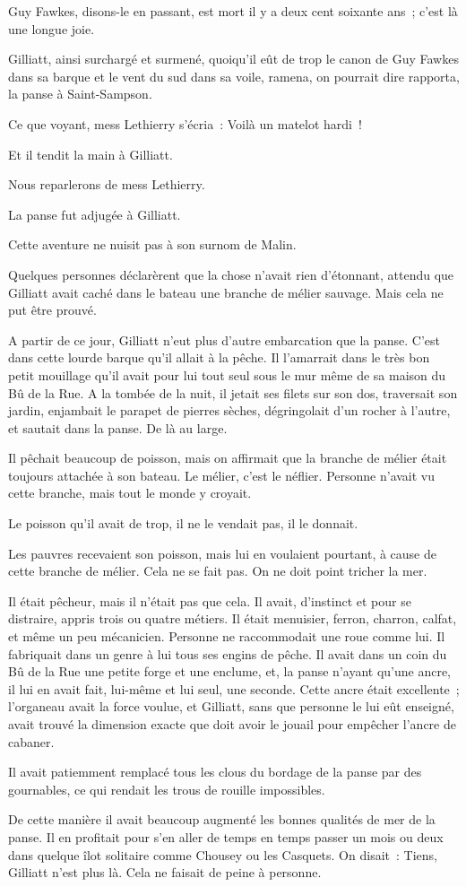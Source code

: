 \documentclass[french,twoside]{book} %
\begin{document}
Guy Fawkes, disons-le en passant, est mort il y a deux cent soixante ans ; c’est là une longue joie.\par
Gilliatt, ainsi surchargé et surmené, quoiqu’il eût de trop le canon de Guy Fawkes dans sa barque et le vent du sud dans sa voile, ramena, on pourrait dire rapporta, la panse à Saint-Sampson.\par
 Ce que voyant, mess Lethierry s’écria : Voilà un matelot hardi !\par
Et il tendit la main à Gilliatt.\par
Nous reparlerons de mess Lethierry.\par
La panse fut adjugée à Gilliatt.\par
Cette aventure ne nuisit pas à son surnom de Malin.\par
Quelques personnes déclarèrent que la chose n’avait rien d’étonnant, attendu que Gilliatt avait caché dans le bateau une branche de mélier sauvage. Mais cela ne put être prouvé.\par
A partir de ce jour, Gilliatt n’eut plus d’autre embarcation que la panse. C’est dans cette lourde barque qu’il allait à la pêche. Il l’amarrait dans le très bon petit mouillage qu’il avait pour lui tout seul sous le mur même de sa maison du Bû de la Rue. A la tombée de la nuit, il jetait ses filets sur son dos, traversait son jardin, enjambait le parapet de pierres sèches, dégringolait d’un rocher à l’autre, et sautait dans la panse. De là au large.\par
Il pêchait beaucoup de poisson, mais on affirmait que la branche de mélier était toujours attachée à son bateau. Le mélier, c’est le néflier. Personne n’avait vu cette branche, mais tout le monde y croyait.\par
Le poisson qu’il avait de trop, il ne le vendait pas, il le donnait.\par
Les pauvres recevaient son poisson, mais lui en voulaient pourtant, à cause de cette branche de mélier. Cela ne se fait pas. On ne doit point tricher la mer.\par
Il était pêcheur, mais il n’était pas que cela. Il avait, d’instinct et pour se distraire, appris trois ou quatre  métiers. Il était menuisier, ferron, charron, calfat, et même un peu mécanicien. Personne ne raccommodait une roue comme lui. Il fabriquait dans un genre à lui tous ses engins de pêche. Il avait dans un coin du Bû de la Rue une petite forge et une enclume, et, la panse n’ayant qu’une ancre, il lui en avait fait, lui-même et lui seul, une seconde. Cette ancre était excellente ; l’organeau avait la force voulue, et Gilliatt, sans que personne le lui eût enseigné, avait trouvé la dimension exacte que doit avoir le jouail pour empêcher l’ancre de cabaner.\par
Il avait patiemment remplacé tous les clous du bordage de la panse par des gournables, ce qui rendait les trous de rouille impossibles.\par
De cette manière il avait beaucoup augmenté les bonnes qualités de mer de la panse. Il en profitait pour s’en aller de temps en temps passer un mois ou deux dans quelque îlot solitaire comme Chousey ou les Casquets. On disait : Tiens, Gilliatt n’est plus là. Cela ne faisait de peine à personne.
\end{document}
